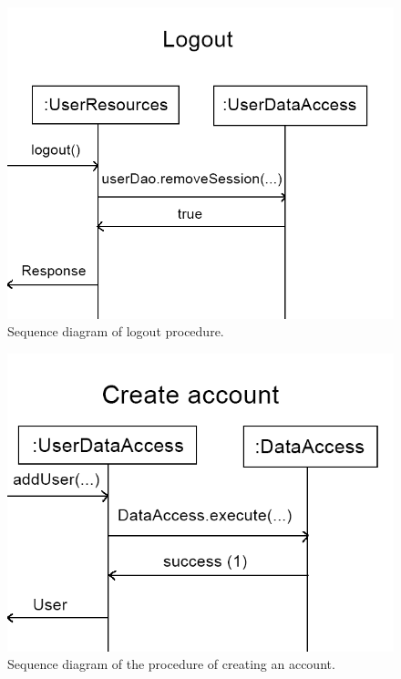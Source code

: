 \documentclass{article}
\begin{document}
\begin{figure}[h]
  \centering
  \includegraphics[scale=0.3]{seqdiagram3.png}
  \caption{Sequence diagram of logout procedure.}
  \label{fig:seq3}
\end{figure}

\begin{figure}[h]
  \centering
  \includegraphics[scale=0.2]{seqdiagram4.png}
  \caption{Sequence diagram of the procedure of creating an account.}
  \label{fig:seq4}
\end{figure}
\end{document}
